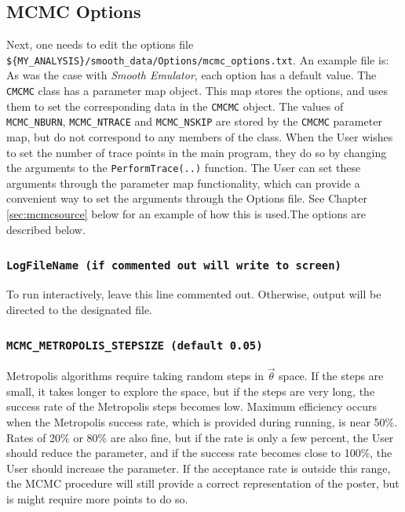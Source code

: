 \documentclass[UserManual.tex]{subfiles}
\begin{document}
\begin{sloppypar}
\subsection{MCMC Options}

Next, one needs to edit the options file {\tt\$\{MY\_ANALYSIS\}/smooth\_data/Options/mcmc\_options.txt}. An example file is:
\vspace*{-8pt}{\tt
\begin{Verbatim}
 # This is for the MCMC search of parameter space
 # (not for the emulator tuning)
 #LogFileName smoothlog.txt # comment out for interactive running
 # If success rate approaches zero, reduce MCMC_METROPOLIS_STEPSIZE, if it approaches 1.0, increase it
 MCMC_METROPOLIS_STEPSIZE 0.06
 MCMC_IGNORE_EMULATOR_ERROR false
 MCMC_RANSEED  12345
 MCMC_NBURN 5
 MCMC_NSKIP 10000
 MCMC_NTRACE 100000
\end{Verbatim}
}\vspace*{-8pt}
As was the case with {\it Smooth Emulator}, each option has a default value. The {\tt CMCMC} class has a parameter map object. This map stores the options, and uses them to set the corresponding data in the {\tt CMCMC} object. The values of {\tt MCMC\_NBURN}, {\tt MCMC\_NTRACE} and {\tt MCMC\_NSKIP} are stored by the {\tt CMCMC} parameter map, but do not correspond to any members of the class. When the User wishes to set the number of trace points in the main program, they do so by changing the arguments to the {\tt PerformTrace(..)} function. The User can set these arguments through the parameter map functionality, which can provide a convenient way to set the arguments through the Options file. See Chapter \ref{sec:mcmcsource} below for an example of how this is used.The options are described below.
\subsubsection{{\tt LogFileName (if commented out will write to screen)}}
To run interactively, leave this line commented out. Otherwise, output will be directed to the designated file.
\subsubsection{{\tt MCMC\_METROPOLIS\_STEPSIZE (default 0.05)}}
Metropolis algorithms require taking random steps in $\vec{\theta}$ space. If the steps are small, it takes longer to explore the space, but if the steps are very long, the success rate of the Metropolis steps becomes low. Maximum efficiency occurs when the Metropolis success rate, which is provided during running, is near 50\%. Rates of 20\% or 80\% are also fine, but if the rate is only a few percent, the User should reduce the parameter, and if the success rate becomes close to 100\%, the User should increase the parameter. If the acceptance rate is outside this range, the MCMC procedure will still provide a correct representation of the poster, but is might require more points to do so.

\end{sloppypar}
\end{document}
